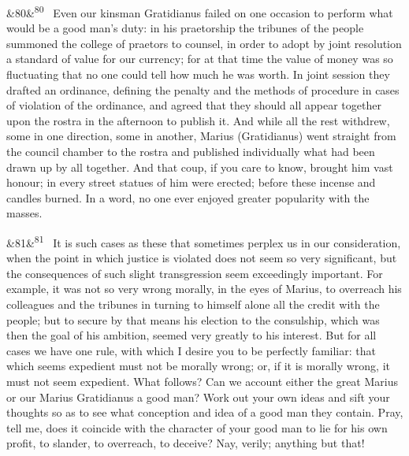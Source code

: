 \documentclass[12pt]{article}
\newcommand{\para}[1][]{\par\noindent\ifx&#1&\else\textsuperscript{\footnotesize #1}~\fi}
\begin{document}
\para[80] Even our kinsman Gratidianus failed on one occasion to perform what would be a good man's duty: in his praetorship the tribunes of the people summoned the college of praetors to counsel, in order to adopt by joint resolution a standard of value for our currency; for at that time the value of money was so fluctuating that no one could tell how much he was worth. In joint session they drafted an ordinance, defining the penalty and the methods of procedure in cases of violation of the ordinance, and agreed that they should all appear together upon the rostra in the afternoon to publish it. And while all the rest withdrew, some in one direction, some in another, Marius (Gratidianus) went straight from the council chamber to the rostra and published individually what had been drawn up by all together. And that coup, if you care to know, brought him vast honour; in every street statues of him were erected; before these incense and candles burned. In a word, no one ever enjoyed greater popularity with the masses.

\para[81] It is such cases as these that sometimes perplex us in our consideration, when the point in which justice is violated does not seem so very significant, but the consequences of such slight transgression seem exceedingly important. For example, it was not so very wrong morally, in the eyes of Marius, to overreach his colleagues and the tribunes in turning to himself alone all the credit with the people; but to secure by that means his election to the consulship, which was then the goal of his ambition, seemed very greatly to his interest. But for all cases we have one rule, with which I desire you to be perfectly familiar: that which seems expedient must not be morally wrong; or, if it is morally wrong, it must not seem expedient. What follows? Can we account either the great Marius or our Marius Gratidianus a good man? Work out your own ideas and sift your thoughts so as to see what conception and idea of a good man they contain. Pray, tell me, does it coincide with the character of your good man to lie for his own profit, to slander, to overreach, to deceive? Nay, verily; anything but that!
\end{document}
